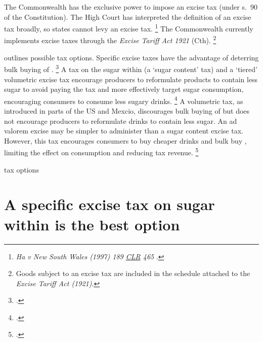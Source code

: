\documentclass[embargoed]{grattan}
\begin{document}
The Commonwealth has the exclusive power to impose an excise tax (under s.~90 of the Constitution).
The High Court has interpreted the definition of an excise tax broadly, so states cannot levy an excise tax.%
\footnote{\emph{Ha v New South Wales (1997) 189 \href{https://en.wikipedia.org/wiki/Commonwealth_Law_Reports}{CLR} 465 }.} 
The Commonwealth currently implements excise taxes through the \emph{Excise Tariff Act 1921} (Cth).%
\footnote{Goods subject to an excise tax are included in the schedule attached to the \emph{Excise Tariff Act (1921)}.}

 outlines possible \SSB{} tax options.
Specific excise taxes have the advantage of deterring bulk buying of \SSBs{}.%
\footcites{Sharma2014effectstaxingsugarsweetened}{Freebairn2010Taxationobesity}{Brownell2009publichealtheconomic}{Bonnet2013Taxincidencestrategic}{Wetter2016TaxingSugarSweetened}{Organization2016FiscalPoliciesDiet} A tax on the sugar within \SSBs{} (a `sugar content' tax) and a `tiered' volumetric excise tax encourage producers to reformulate products to contain less sugar to avoid paying the tax and more effectively target sugar consumption, encouraging consumers to consume less sugary drinks.%
\footcites{Smith2016SoftDrinksLevy}{Organization2016FiscalPoliciesDiet} A volumetric tax, as introduced in parts of the US and Mexcio, discourages bulk buying of \SSBs{} but does not encourage producers to reformulate drinks to contain less sugar. An ad valorem excise may be simpler to administer than a sugar content excise tax.
However, this tax encourages consumers to buy cheaper drinks and bulk buy \SSBs{}, limiting the effect on consumption and reducing tax revenue.%
\footcites{Powell2013Assessingpotentialeffectiveness}{Sharma2014effectstaxingsugarsweetened}{Brownell2009publichealtheconomic}{Organization2016FiscalPoliciesDiet}


\begin{table}
\caption{\SSB{} tax options}\label{tbl:SSB-tax-options}




\end{table}

\section{A specific excise tax on sugar within \SSBs{} is the best option}\label{a-specific-excise-tax-on-sugar-within-ssbs-is-the-best-option}
\end{document}
